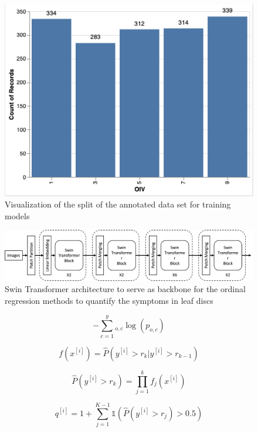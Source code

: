 \documentclass[english]{article}
\begin{document}
\begin{figure}[H]
    \begin{center}
        \includegraphics[width=0.7\linewidth]{2023_a_oiv_oiv_distribution}
        \caption{Visualization of the split of the annotated data set for training models}\label{fig:datadistribution}
    \end{center}
\end{figure}

\begin{figure}[H]
    \centering
    \includegraphics[width=0.9\linewidth]{p_viticola/resources/images/swin_transformer.png}
    \caption{Swin Transformer architecture to serve as backbone for the ordinal regression methods to quantify the symptoms in leaf discs}
    \label{fig:enter-label}
\end{figure}

\begin{equation}
    -\sum_{c=1}^y_{o,c}\log(p_{o,c})\label{fml:crossentropy}
\end{equation}

\begin{equation}
    f(x^{[i]}) = \hat{P}(y^{[i]} > r_{k}|y^{[i]} > r_{k-1})\label{fml:binclass}
\end{equation}

\begin{equation}
    \hat{P}(y^{[i]} > r_{k}) = \prod_{j=1}^{k}f_{j}(x^{[i]})\label{fml:unconditionalprob}
\end{equation}

\begin{equation}
    q^{[i]} = 1 + \sum_{j=1}^{K-1}\mathbb{1}(\hat{P}(y^{[i]} > r_{j}) > 0.5)\label{fml:rankprob}
\end{equation}
\end{document}
